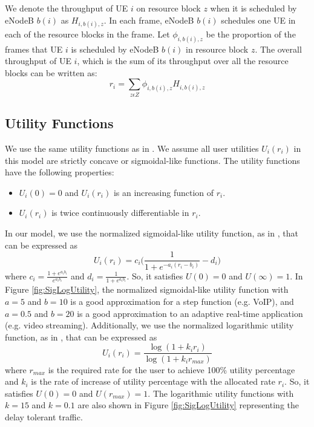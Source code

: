\documentclass[conference]{IEEEtran}
\begin{document}
We denote the throughput of UE $i$ on resource block $z$ when it is scheduled by eNodeB $b(i)$ as $H_{i,b(i),z}$. In each frame, eNodeB $b(i)$ schedules one UE in each of the resource blocks in the frame. Let $\phi_{i,b(i),z}$ be the proportion of the frames that UE $i$ is scheduled by eNodeB $b(i)$ in resource block $z$. The overall throughput of UE $i$, which is the sum of its throughput over all the resource blocks can be written as:
\begin{equation}\label{eqn:throughput}
r_i = \sum_{z\epsilon Z}\phi_{i,b(i),z} H_{i,b(i),z} 
\end{equation}


\subsection{Utility Functions}\label{sec:utilities}

We use the same utility functions as in \cite{Ahmed_Utility1}. We assume all user utilities $U_i(r_i)$ in this model are strictly concave or sigmoidal-like functions. The utility functions have the following properties: 
\begin{itemize}
\item $U_i(0) = 0$ and $U_i(r_i)$ is an increasing function of $r_i$.
\item $U_i(r_i)$ is twice continuously differentiable in $r_i$.
\end{itemize}
In our model, we use the normalized sigmoidal-like utility function, as in \cite{DL_PowerAllocation}, that can be expressed as 
\begin{equation}\label{eqn:sigmoid}
U_i(r_i) = c_i\Big(\frac{1}{1+e^{-a_i(r_i-b_i)}}-d_i\Big)
\end{equation}
where $c_i = \frac{1+e^{a_ib_i}}{e^{a_ib_i}}$ and $d_i = \frac{1}{1+e^{a_ib_i}}$. So, it satisfies $U(0)=0$ and $U(\infty)=1$. In Figure \ref{fig:SigLogUtility}, the normalized sigmoidal-like utility function with $a=5$ and $b=10$ is a good approximation for a step function (e.g. VoIP), and $a=0.5$ and $b=20$ is a good approximation to an adaptive real-time application (e.g. video streaming). Additionally, we use the normalized logarithmic utility function, as in \cite{UtilityFairness}, that can be expressed as 
\begin{equation}\label{eqn:log}
U_i(r_i) = \frac{\log(1+k_ir_i)}{\log(1+k_i r_{max})}
\end{equation}
where $r_{max}$ is the required rate for the user to achieve 100\% utility percentage and $k_i$ is the rate of increase of utility percentage with the allocated rate $r_i$. So, it satisfies $U(0)=0$ and $U(r_{max})=1$. The logarithmic utility functions with $k=15$ and $k=0.1$ are also shown in Figure \ref{fig:SigLogUtility} representing the delay tolerant traffic. 
 
\end{document}
